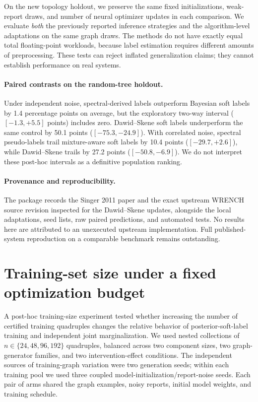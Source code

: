 \documentclass[10pt]{article}
\begin{document}
On the new topology holdout, we preserve the same fixed initializations, weak-report draws, and number of neural optimizer updates in each comparison. We evaluate \emph{both} the previously reported inference strategies and the algorithm-level adaptations on the same graph draws. The methods do not have exactly equal total floating-point workloads, because label estimation requires different amounts of preprocessing. These tests can reject inflated generalization claims; they cannot establish performance on real systems.

\paragraph{Paired contrasts on the random-tree holdout.}
Under independent noise, spectral-derived labels outperform Bayesian soft labels by 1.4 percentage points on average, but the exploratory two-way interval ($[-1.3,+5.5]$ points) includes zero. Dawid--Skene soft labels underperform the same control by 50.1 points ($[-75.3,-24.9]$). With correlated noise, spectral pseudo-labels trail mixture-aware soft labels by 10.4 points ($[-29.7,+2.6]$), while Dawid--Skene trails by 27.2 points ($[-50.8,-6.9]$). We do not interpret these post-hoc intervals as a definitive population ranking.

\paragraph{Provenance and reproducibility.} The package records the Singer 2011 paper and the exact upstream WRENCH source revision inspected for the Dawid--Skene updates, alongside the local adaptations, seed lists, raw paired predictions, and automated tests. No results here are attributed to an unexecuted upstream implementation. Full published-system reproduction on a comparable benchmark remains outstanding.


\section{Training-set size under a fixed optimization budget}
\label{sec:scale}
A post-hoc training-size experiment tested whether increasing the number of certified training quadruples changes the relative behavior of posterior-soft-label training and independent joint marginalization. We used nested collections of $n\in\{24,48,96,192\}$ quadruples, balanced across two component sizes, two graph-generator families, and two intervention-effect conditions. The independent sources of training-graph variation were two generation seeds; within each training pool we used three coupled model-initialization/report-noise seeds. Each pair of arms shared the graph examples, noisy reports, initial model weights, and training schedule.
\end{document}
